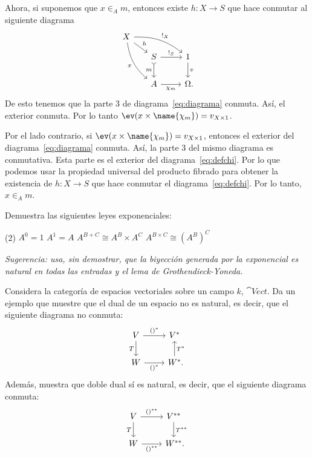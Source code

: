 \begin{solution}[print=true]
  Ahora, si suponemos que \(x\in_A m\), entonces existe \(h\colon X\to S\) que
  hace conmutar al siguiente diagrama
  \begin{equation}\label{eq:defchi}
    \begin{tikzcd}[ampersand replacement=\&]
      X\ar[bend left=20]{rrd}{!_X}\ar[bend right=20]{ddr}[swap]{x}
        \ar{rd}{h}\\[-2ex]
      \&[-2ex] S\ar{r}{!_S}\ar[tail]{d}[swap]{m} \& 1\ar{d}{v}\\
      \& A\ar{r}[swap]{\chi_m} \& \Omega\mathrlap{.}
    \end{tikzcd}
  \end{equation}
  De esto tenemos que la parte 3 de diagrama~\eqref{eq:diagrama} conmuta. Así, el
  exterior conmuta. Por lo tanto \(\ev(x\times\name{\chi_m})=v_{X\times 1}\).
  
  Por el lado contrario, si \(\ev(x\times\name{\chi_m})=v_{X\times 1}\),
  entonces el exterior del diagrama~\eqref{eq:diagrama} conmuta. Así, la parte 3
  del mismo diagrama es conmutativa. Esta parte es el exterior del
  diagrama~\eqref{eq:defchi}. Por lo que podemos usar la propiedad universal del
  producto fibrado para obtener la existencia de \(h\colon X\to S\) que hace
  conmutar el diagrama~\eqref{eq:defchi}. Por lo tanto, \(x\in_A m\). 
\end{solution}

\begin{exercise}[par=2]
  Demuestra las siguientes leyes exponenciales:
  \begin{tasks}(2)
    \task \(A^0=1\)
    \task \(A^1=A\)
    \task \(A^{B+C}\cong A^B\times A^C\)
    \task \(A^{B\times C}\cong (A^B)^C\)
  \end{tasks}
  \textit{Sugerencia: usa, sin demostrar, que la biyección generada por la exponencial es natural en todas las entradas y el lema de Grothendieck-Yoneda.}
\end{exercise}

\begin{exercise}[par=2]
  Considera la categoría de espacios vectoriales sobre un campo \(k\),
  \(\cat{Vect}\). Da un ejemplo que muestre que el dual de un espacio no es
  natural, es decir, que el siguiente diagrama no conmuta:
  \begin{equation*}
    \begin{tikzcd}[ampersand replacement=\&]
      V\ar{r}{()^*}\ar{d}[swap]{T} \& V^*\\
      W\ar{r}[swap]{()^*} \& W^*\mathrlap{.}\ar{u}[swap]{T^*}     
    \end{tikzcd}
  \end{equation*}
  Además, muestra que doble dual sí es natural, es decir, que el
  siguiente diagrama conmuta:
  \begin{equation*}
    \begin{tikzcd}[ampersand replacement=\&]
      V\ar{r}{()^{**}}\ar{d}[swap]{T} \& V^{**}\ar{d}{T^{**}}\\
      W\ar{r}[swap]{()^{**}} \& W^{**}\mathrlap{.}
    \end{tikzcd}
  \end{equation*}
\end{exercise}